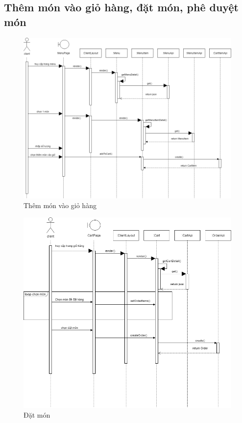 \subsection{Thêm món vào giỏ hàng, đặt món, phê duyệt món}

\begin{figure}[!h]
    \begin{center}
        \includegraphics[scale=0.4]{Images/SequenceDiagram/insertToCart.png}
    \end{center}
    \hspace{0.3cm}
    \caption{Thêm món vào giỏ hàng}
\end{figure}

\newpage

\begin{figure}[!h]
    \begin{center}
        \includegraphics[scale=0.5]{Images/SequenceDiagram/makeOrder.png}
    \end{center}
    \hspace{0.3cm}
    \caption{Đặt món}
\end{figure}

